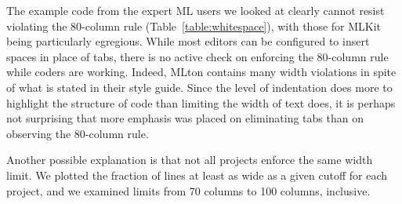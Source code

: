 \documentclass[12pt,abstracton]{scrartcl}
\begin{document}
The example code from the expert ML users we looked at clearly cannot
resist violating the 80-column rule (Table~\ref{table:whitespace}), with
those for MLKit being particularly egregious. While most editors can be configured to insert
spaces in place of tabs, there is no active check on enforcing the 80-column
rule while coders are working.
Indeed, MLton contains many width violations in spite of what is stated in their style guide.
Since the level of indentation does more to highlight the structure of code than
limiting the width of text does, it is perhaps not surprising that more
emphasis was placed on eliminating tabs than on observing the 80-column rule.

Another possible explanation is that not all projects enforce the same width limit.
We plotted the fraction of lines at least as wide as a given cutoff for each project,
and we examined limits from 70 columns to 100 columns, inclusive.
\end{document}
